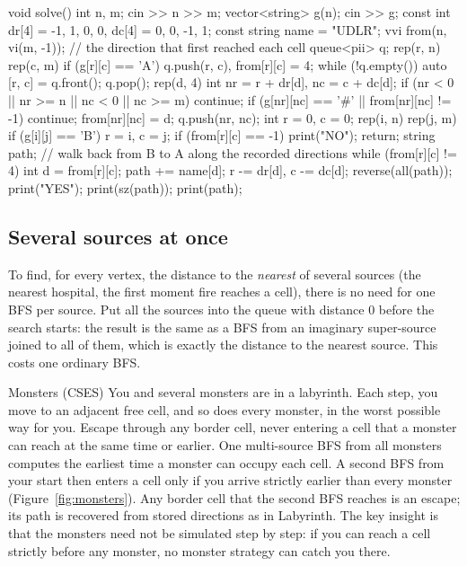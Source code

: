 \begin{code}
void solve() {
    int n, m;
    cin >> n >> m;
    vector<string> g(n);
    cin >> g;
    const int dr[4] = {-1, 1, 0, 0}, dc[4] = {0, 0, -1, 1};
    const string name = "UDLR";
    vvi from(n, vi(m, -1));  // the direction that first reached each cell
    queue<pii> q;
    rep(r, n) rep(c, m) if (g[r][c] == 'A') q.push({r, c}), from[r][c] = 4;
    while (!q.empty()) {
        auto [r, c] = q.front();
        q.pop();
        rep(d, 4) {
            int nr = r + dr[d], nc = c + dc[d];
            if (nr < 0 || nr >= n || nc < 0 || nc >= m) continue;
            if (g[nr][nc] == '#' || from[nr][nc] != -1) continue;
            from[nr][nc] = d;
            q.push({nr, nc});
        }
    }
    int r = 0, c = 0;
    rep(i, n) rep(j, m) if (g[i][j] == 'B') r = i, c = j;
    if (from[r][c] == -1) {
        print("NO");
        return;
    }
    string path;  // walk back from B to A along the recorded directions
    while (from[r][c] != 4) {
        int d = from[r][c];
        path += name[d];
        r -= dr[d], c -= dc[d];
    }
    reverse(all(path));
    print("YES");
    print(sz(path));
    print(path);
}
\end{code}


\subsection{Several sources at once}

To find, for every vertex, the distance to the \emph{nearest} of several sources (the nearest hospital, the first moment fire
reaches a cell), there is no need for one BFS per source. Put all the sources into the queue with distance 0 before the
search starts: the result is the same as a BFS from an imaginary super-source joined to all of them, which is exactly the
distance to the nearest source. This  costs one ordinary BFS.

\begin{problem}{Monsters (CSES)}
You and several monsters are in a labyrinth. Each step, you move to an adjacent free cell, and so does every monster, in the
worst possible way for you. Escape through any border cell, never entering a cell that a monster can reach at the same time
or earlier.
\solution One multi-source BFS from all monsters computes the earliest time a monster can occupy each cell. A second BFS from
your start then enters a cell only if you arrive strictly earlier than every monster (Figure~\ref{fig:monsters}). Any border
cell that the second BFS reaches is an escape; its path is recovered from stored directions as in Labyrinth. The key insight
is that the monsters need not be simulated step by step: if you can reach a cell strictly before any monster, no monster
strategy can catch you there.
\end{problem}

